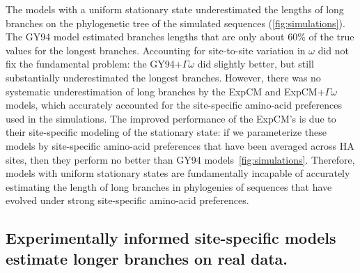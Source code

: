 \documentclass[11pt]{article}
\begin{document}
The models with a uniform stationary state underestimated the lengths of long branches on the phylogenetic tree of the simulated sequences (\ref{fig:simulations}). 
The GY94 model estimated branches lengths that are only about 60\% of the true values for the longest branches. 
Accounting for site-to-site variation in $\omega$ did not fix the fundamental problem: the GY94+$\Gamma\omega$ did slightly better, but still substantially underestimated the longest branches.
However, there was no systematic underestimation of long branches by the ExpCM and ExpCM+$\Gamma\omega$ models, which accurately accounted for the site-specific amino-acid preferences used in the simulations.
The improved performance of the ExpCM's is due to their site-specific modeling of the stationary state: if we parameterize these models by site-specific amino-acid preferences that have been averaged across HA sites, then they perform no better than GY94 models~\ref{fig:simulations}.
Therefore, models with uniform stationary states are fundamentally incapable of accurately estimating the length of long branches in phylogenies of sequences that have evolved under strong site-specific amino-acid preferences.


\subsection*{Experimentally informed site-specific models estimate longer branches on real data.}
\end{document}
